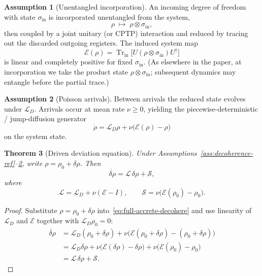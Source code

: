 \documentclass[11pt]{article}
\newtheorem{theorem}{Theorem}[section]
\theoremstyle{definition}
\newtheorem{assumption}[theorem]{Assumption}
\theoremstyle{remark}
\newcommand{\Tr}{\operatorname{Tr}}
\begin{document}
\begin{assumption}[Unentangled incorporation]
\label{ass:unentangled-in}
An incoming degree of freedom with state $\sigma_{\mathrm{in}}$ is incorporated unentangled from the system,
\begin{equation}
  \rho\;\longmapsto\;\rho\otimes\sigma_{\mathrm{in}},
\end{equation}
then coupled by a joint unitary (or CPTP) interaction and reduced by tracing out the discarded outgoing registers.
The induced system map
\begin{equation}
  \mathcal E(\rho)=\Tr_{\mathrm{in}}\!\bigl[U(\rho\otimes\sigma_{\mathrm{in}})U^\dagger\bigr]
\end{equation}
is linear and completely positive for fixed $\sigma_{\mathrm{in}}$.
(As elsewhere in the paper, at incorporation we take the product state $\rho\otimes\sigma_{\mathrm{in}}$; subsequent dynamics may entangle before the partial trace.)
\end{assumption}

\begin{assumption}[Poisson arrivals]
\label{ass:poisson-arrivals}
Between arrivals the reduced state evolves under $\mathcal L_D$.
Arrivals occur at mean rate $\nu\ge0$, yielding the piecewise-deterministic / jump-diffusion generator
\begin{equation}
  \dot\rho=\mathcal L_D\rho+\nu\bigl(\mathcal E(\rho)-\rho\bigr)
  \label{eq:full-accrete-decohere}
\end{equation}
on the system state.
\end{assumption}

\begin{theorem}[Driven deviation equation]
\label{thm:driven-deviation}
Under Assumptions~\ref{ass:decoherence-ref}--\ref{ass:poisson-arrivals}, write $\rho=\rho_0+\delta\rho$.
Then
\begin{equation}
  \dot{\delta\rho}=\mathcal L\,\delta\rho+\mathcal S,
  \label{eq:driven-dev}
\end{equation}
where
\begin{equation}
  \mathcal L=\mathcal L_D+\nu(\mathcal E-I),\qquad
  \mathcal S=\nu\bigl(\mathcal E(\rho_0)-\rho_0\bigr).
  \label{eq:L-S-split}
\end{equation}
\end{theorem}

\begin{proof}
Substitute $\rho=\rho_0+\delta\rho$ into~\eqref{eq:full-accrete-decohere} and use linearity of $\mathcal L_D$ and $\mathcal E$ together with $\mathcal L_D\rho_0=0$:
\begin{align*}
  \dot{\delta\rho}
  &=\mathcal L_D(\rho_0+\delta\rho)+\nu\bigl(\mathcal E(\rho_0+\delta\rho)-(\rho_0+\delta\rho)\bigr)\\
  &=\mathcal L_D\delta\rho+\nu\bigl(\mathcal E(\delta\rho)-\delta\rho\bigr)+\nu\bigl(\mathcal E(\rho_0)-\rho_0\bigr)\\
  &=\mathcal L\,\delta\rho+\mathcal S.
\end{align*}
\end{proof}
\end{document}
